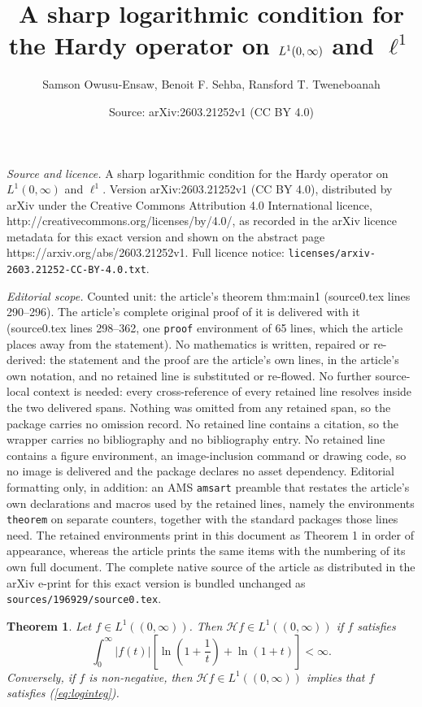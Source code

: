 \documentclass[10pt,a4paper]{amsart}
\title{A sharp logarithmic condition for the Hardy operator on $\Lp{1}$ and $\ell^1$}
\author{Samson Owusu-Ensaw, Benoit F. Sehba, Ransford T. Tweneboanah}
\date{Source: arXiv:2603.21252v1 (CC BY 4.0)}
\newtheorem{theorem}{Theorem}
\newcommand{\Lp}[1]{L^{#1}(0,\infty)}
\begin{document}
\maketitle

\noindent\emph{Source and licence.} A sharp logarithmic condition for the Hardy operator on $\Lp{1}$ and $\ell^1$. Version arXiv:2603.21252v1 (CC BY 4.0), distributed by arXiv under the Creative Commons Attribution 4.0 International licence, http://creativecommons.org/licenses/by/4.0/, as recorded in the arXiv licence metadata for this exact version and shown on the abstract page https://arxiv.org/abs/2603.21252v1. Full licence notice: \texttt{licenses/arxiv-2603.21252-CC-BY-4.0.txt}.\par\smallskip

\noindent\textit{Editorial scope.} Counted unit: the article's theorem thm:main1 (source0.tex lines 290--296). The article's complete original proof of it is delivered with it (source0.tex lines 298--362, one \texttt{proof} environment of 65 lines, which the article places away from the statement). No mathematics is written, repaired or re-derived: the statement and the proof are the article's own lines, in the article's own notation, and no retained line is substituted or re-flowed.  No further source-local context is needed: every cross-reference of every retained line resolves inside the two delivered spans.  Nothing was omitted from any retained span, so the package carries no omission record.  No retained line contains a citation, so the wrapper carries no bibliography and no bibliography entry.  No retained line contains a figure environment, an image-inclusion command or drawing code, so no image is delivered and the package declares no asset dependency.  Editorial formatting only, in addition: an AMS \texttt{amsart} preamble that restates the article's own declarations and macros used by the retained lines, namely the environments \texttt{theorem} on separate counters, together with the standard packages those lines need.  The retained environments print in this document as Theorem 1 in order of appearance, whereas the article prints the same items with the numbering of its own full document.  The complete native source of the article as distributed in the arXiv e-print for this exact version is bundled unchanged as \texttt{sources/196929/source0.tex}.
\begin{theorem}\label{thm:main1}
Let $f\in L^1((0,\infty))$. Then $\mathcal{H}f\in L^1((0,\infty))$ if $f$ satisfies
\begin{equation}\label{eq:loginteg}
\int_0^\infty\vert f(t)\vert\left[\ln\left(1+\frac{1}{t}\right)+\ln\left(1+t\right)\right]<\infty.
\end{equation}
Conversely, if $f$ is non-negative, then $\mathcal{H}f\in L^1((0,\infty))$ implies that $f$ satisfies (\ref{eq:loginteg}).    
\end{theorem}
\end{document}
